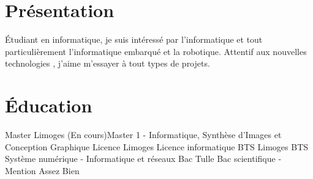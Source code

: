 \documentclass[letterpaper]{twentysecondcv} %
\begin{document}

\aboutme{} %







\makeprofile %


\section{Présentation}
\newline
\newline
Étudiant en informatique, je suis intéressé par l'informatique et tout particulièrement l'informatique embarqué et la robotique. 
\newline Attentif aux nouvelles technologies , j'aime m'essayer à tout types de projets.


\section{Éducation}

\begin{twenty} %
	  {Master}    {Limoges}   {(En cours)Master 1 - Informatique, Synthèse d’Images et Conception Graphique}
	  {Licence}   {Limoges}   {Licence informatique}
	  {BTS}       {Limoges}   {BTS Système numérique - Informatique et réseaux}
	       {Bac}       {Tulle}     {Bac scientifique - Mention Assez Bien}
\end{twenty}
\end{document}
